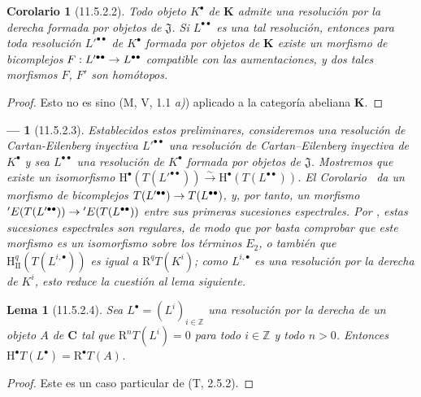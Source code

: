 \documentclass[10pt,oneside,openany]{book}
\theoremstyle{egaenv}\newtheorem*{env}{---}
\theoremstyle{egastatement}
\newtheorem*{lemma}{Lema}
\newtheorem*{corollary}{Corolario}
\theoremstyle{egadescription}
\newcommand{\oldpage}[2][]{\marginnote{\normalfont\scriptsize\textbf{#1}\,|\,#2}\ignorespaces}
\renewcommand{\to}{\mathchoice{\longrightarrow}{\rightarrow}{\rightarrow}{\rightarrow}}
\begin{document}
\begin{corollary}[11.5.2.2]
\label{0.11.5.2.2}
\label{0.11.5.2.2-fr}
Todo objeto $K^\bullet$ de $\boldsymbol{K}$ admite una resolución por la derecha formada por objetos de $\mathfrak J$.
Si $L^{\bullet\bullet}$ es una tal resolución, entonces para toda resolución $L'^{\bullet\bullet}$ de $K^\bullet$ formada por objetos de $\boldsymbol{K}$ existe un morfismo de bicomplejos
$F:L'^{\bullet\bullet}\to L^{\bullet\bullet}$ compatible con las aumentaciones, y dos tales morfismos $F$, $F'$ son homótopos.
\end{corollary}

\begin{proof}
Esto no es sino (M, V, 1.1 \emph{a)}) aplicado a la categoría abeliana
$\boldsymbol{K}$.
\end{proof}

\begin{env}[11.5.2.3]
\label{0.11.5.2.3-fr}
Establecidos estos preliminares, consideremos una resolución de Cartan-Eilenberg inyectiva $L'^{\bullet\bullet}$ una resolución de Cartan--Eilenberg inyectiva de $K^\bullet$ y sea $L^{\bullet\bullet}$ una resolución de $K^\bullet$ formada por objetos de $\mathfrak J$.
Mostremos que existe un isomorfismo
$\mathrm H^\bullet(T(L'^{\bullet\bullet}))\xrightarrow{\sim}\mathrm H^\bullet(T(L^{\bullet\bullet}))$.
El Corolario~ da un morfismo de bicomplejos
$T(L'^{\bullet\bullet})\to T(L^{\bullet\bullet})$,
y, por tanto, un morfismo
$'E(T(L'^{\bullet\bullet}))\to{}'E(T(L^{\bullet\bullet}))$
entre sus primeras sucesiones espectrales.
Por , estas sucesiones espectrales son \emph{regulares}, de modo que por  basta comprobar que este morfismo es un isomorfismo sobre los términos $E_2$, o también que $\mathrm H_{\mathrm{II}}^q(T(L^{i,\bullet}))$ es igual a $\mathrm R^qT(K^i)$; como $L^{i,\bullet}$ es una resolución por la derecha de $K^i$, esto reduce la cuestión al lema siguiente.
\end{env}

\oldpage[0\textsubscript{III}]{38}
\begin{lemma}[11.5.2.4]
\label{0.11.5.2.4}
\label{0.11.5.2.4-fr}
Sea $L^\bullet=(L^i)_{i\in\mathbb Z}$ una resolución por la derecha de un objeto $A$ de $\boldsymbol{C}$ tal que $\mathrm R^nT(L^i)=0$ para todo $i\in\mathbb Z$ y todo $n>0$.
Entonces
$\mathrm H^\bullet T(L^\bullet)=\mathrm R^\bullet T(A)$.
\end{lemma}

\begin{proof}
Este es un caso particular de (T, 2.5.2).
\end{proof}
\end{document}
